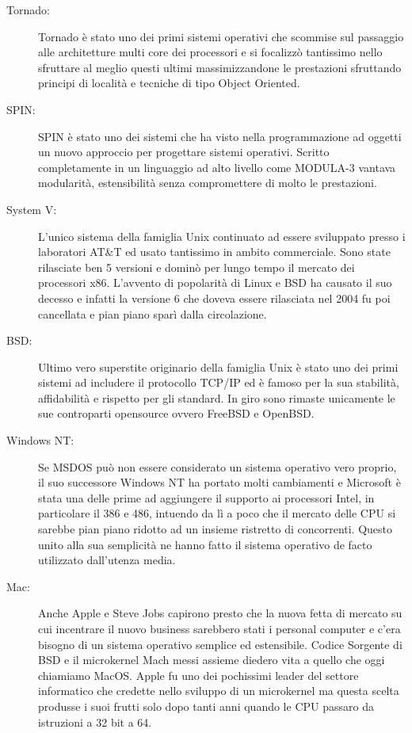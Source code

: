 \begin{description}
  \item[Tornado:] Tornado è stato uno dei primi sistemi operativi che scommise sul passaggio alle architetture multi core dei processori e si focalizzò tantissimo nello sfruttare al meglio questi ultimi massimizzandone le prestazioni sfruttando principi di località e tecniche di tipo Object Oriented.\cite{gamsa98}
  \item[SPIN:] SPIN è stato uno dei sistemi che ha visto nella programmazione ad oggetti un nuovo approccio per progettare sistemi operativi. Scritto completamente in un linguaggio ad alto livello come MODULA-3 vantava modularità, estensibilità senza compromettere di molto le prestazioni.\cite{bershad95}
  \item[System V:] L'unico sistema della famiglia Unix continuato ad essere sviluppato presso i laboratori AT\&T ed usato tantissimo in ambito commerciale. Sono state rilasciate ben 5 versioni e dominò per lungo tempo il mercato dei processori x86. L'avvento di popolarità di Linux e BSD ha causato il suo decesso e infatti la versione 6 che doveva essere rilasciata nel 2004 fu poi cancellata e pian piano sparì dalla circolazione. 
  \item[BSD:] Ultimo vero superstite originario della famiglia Unix è stato uno dei primi sistemi ad includere il protocollo TCP/IP ed è famoso per la sua stabilità, affidabilità e rispetto per gli standard. In giro sono rimaste unicamente le sue controparti opensource ovvero FreeBSD e OpenBSD.
  \item[Windows NT:] Se MSDOS può non essere considerato un sistema operativo vero proprio, il suo successore Windows NT ha portato molti cambiamenti e Microsoft è stata una delle prime ad aggiungere il supporto ai processori Intel, in particolare il 386 e 486, intuendo da lì a poco che il mercato delle CPU si sarebbe pian piano ridotto ad un insieme ristretto di concorrenti. Questo unito alla sua semplicità ne hanno fatto il sistema operativo de facto utilizzato dall'utenza media.
  \item[Mac:] Anche Apple e Steve Jobs capirono presto che la nuova fetta di mercato su cui incentrare il nuovo business sarebbero stati i personal computer e c'era bisogno di un sistema operativo semplice ed estensibile. Codice Sorgente di BSD e il microkernel Mach messi assieme diedero vita a quello che oggi chiamiamo MacOS. Apple fu uno dei pochissimi leader del settore informatico che credette nello sviluppo di un microkernel ma questa scelta  produsse i suoi frutti solo dopo tanti anni quando le CPU passaro da istruzioni a 32 bit a 64.

\end{description}
